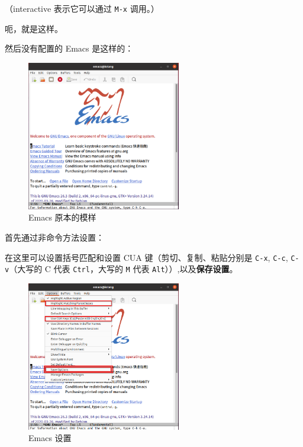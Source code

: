 \documentclass[UTF-8]{ctexart}
\begin{document}
				（interactive 表示它可以通过 \texttt{M-x} 调用。）
				
				呃，就是这样。
				
				然后没有配置的 Emacs 是这样的：
				
				\begin{figure}[H]
					\centering
					\includegraphics[width=0.6\textwidth]{fig/emacs_orig.png}
					\caption*{Emacs 原本的模样}
				\end{figure}
				
				首先通过非命令方法设置：
				
				在这里可以设置括号匹配和设置 CUA 键（剪切、复制、粘贴分别是 \texttt{C-x}, \texttt{C-c}, \texttt{C-v}（大写的 C 代表 \texttt{Ctrl}，大写的 \texttt{M} 代表 \texttt{Alt}））,以及\textbf{\large 保存设置}。
				
				\begin{figure}[H]
					\centering
					\includegraphics[width=0.6\textwidth]{fig/emacs_options.png}
					\caption*{Emacs 设置}
				\end{figure}
			
\end{document}
